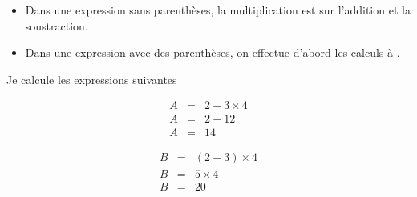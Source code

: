 \begin{myprop}
	\begin{itemize}
		\item Dans une expression sans parenthèses, la multiplication est  sur l'addition et la soustraction.
		
		\item Dans une expression avec des parenthèses, on effectue d'abord les calculs à .
	\end{itemize}
\end{myprop}


\begin{myexs}
	Je calcule les expressions suivantes
	
	\begin{multicols}{2}
		\begin{eqnarray*}
			A &=& 2 + 3 \times 4 \\
			A &=& 2 + 12 \\
			A &=& 14
		\end{eqnarray*}
	
	
		\begin{eqnarray*}
			B &=& (2 + 3) \times 4 \\
			B &=& 5 \times 4 \\
			B &=& 20
		\end{eqnarray*}
	\end{multicols}
\end{myexs}
